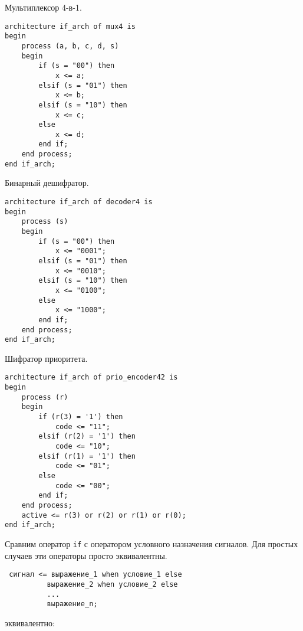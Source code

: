  Мультиплексор 4-в-1.

\begin{Code}
\begin{lstlisting}
architecture if_arch of mux4 is
begin
    process (a, b, c, d, s)
    begin
        if (s = "00") then
            x <= a;
        elsif (s = "01") then
            x <= b;
        elsif (s = "10") then
            x <= c;
        else
            x <= d;
        end if;
    end process;
end if_arch;
\end{lstlisting}
\end{Code}

 Бинарный дешифратор.

\begin{Code}
\begin{lstlisting}
architecture if_arch of decoder4 is
begin
    process (s)
    begin
        if (s = "00") then
            x <= "0001";
        elsif (s = "01") then
            x <= "0010";
        elsif (s = "10") then
            x <= "0100";
        else
            x <= "1000";
        end if;
    end process;
end if_arch;
\end{lstlisting}
\end{Code}

 Шифратор приоритета.

\begin{Code}
\begin{lstlisting}
architecture if_arch of prio_encoder42 is
begin
    process (r)
    begin
        if (r(3) = '1') then
            code <= "11";
        elsif (r(2) = '1') then
            code <= "10";
        elsif (r(1) = '1') then
            code <= "01";
        else
            code <= "00";
        end if;
    end process;
    active <= r(3) or r(2) or r(1) or r(0);
end if_arch;
\end{lstlisting}
\end{Code}

Сравним оператор \lstinline?if? с оператором условного назначения сигналов. Для простых случаев эти операторы просто эквивалентны.

\begin{Code}
\begin{lstlisting}
 сигнал <= выражение_1 when условие_1 else 
          выражение_2 when условие_2 else 
          ...
          выражение_n;
\end{lstlisting}
\end{Code}

эквивалентно:

